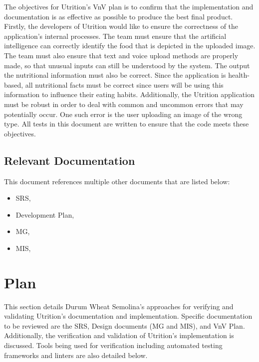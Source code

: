 \documentclass[12pt, titlepage]{article}
\begin{document}
		The objectives for Utrition's VnV plan is to confirm that the implementation and documentation is as effective as possible to produce the best final product. Firstly, the developers of Utrition would like to ensure the correctness of the application's internal processes. The team must ensure that the artificial intelligence can correctly identify the food that is depicted in the uploaded image. The team must also ensure that text and voice upload methods are properly made, so that unusual inputs can still be understood by the system. The output the nutritional information must also be correct. Since the application is health-based, all nutritional facts must be correct since users will be using this information to influence their eating habits. Additionally, the Utrition application must be robust in order to deal with common and uncommon errors that may potentially occur. One such error is the user uploading an image of the wrong type. All tests in this document are written to ensure that the code meets these objectives. 
	
	\subsection{Relevant Documentation}
	

		This document references multiple other documents that are listed below:
		
		\begin{itemize}
			\item SRS, \citet{SRS}
			\item Development Plan, \citet{DevelopmentPlan}
			\item MG, \citet{MG}
			\item MIS, \citet{MIS}
		\end{itemize}
	
	\section{Plan}
	
	This section details Durum Wheat Semolina's approaches for verifying and validating Utrition's documentation and implementation. Specific documentation to be reviewed are the SRS, Design documents (MG and MIS), and VnV Plan. Additionally, the verification and validation of Utrition's implementation is discussed. Tools being used for verification including automated testing frameworks and linters are also detailed below.
	
\end{document}
